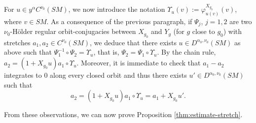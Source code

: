 \documentclass[JEP,XML,SOM,Unicode,NoFloatCountersInSection]{cedram}
\theoremstyle{plain}
\theoremstyle{definition}
\begin{document}
{\color{black}For $u \in y^\alpha C^{\nu_0}(SM)$, we now introduce the notation $\Upsilon_u(v) := \varphi^{X_{g_0}}_{u(v)}(v)$, where $v \in SM$. As a consequence of the previous paragraph,} if $\Psi_j$, $j=1,2$ are two $\nu_0$-Hölder regular orbit-conjugacies between $X_{g_0}$ and $Y_{g}$ (for $g$ close to $g_0$) with stretches $a_1, a_2 \in C^{\nu_0}(SM)$, we deduce that there exists $u \in D^{\alpha_0,\nu_0}(SM)$ as above such that $\Psi_1^{-1}\circ\Psi_2 = \Upsilon_{u}$, that is, $\Psi_2= \Psi_1 \circ \Upsilon_{u}$. By the chain rule, $a_2 = (1+X_{g_0} u) a_1\circ \Upsilon_{u}$. Moreover, it is immediate to check that $a_1-a_2$ integrates to $0$ along every closed orbit and thus there exists $u' \in D^{\alpha_0,\nu_0}(SM)$ such that
\begin{equation}
\label{equation:rem}
a_2 = (1+X_{g_0}u)a_1 \circ \Upsilon_u = a_1 + X_{g_0}u'.
\end{equation}

From these observations, we can now prove Proposition \ref{thm:estimate-stretch}.
\end{document}
